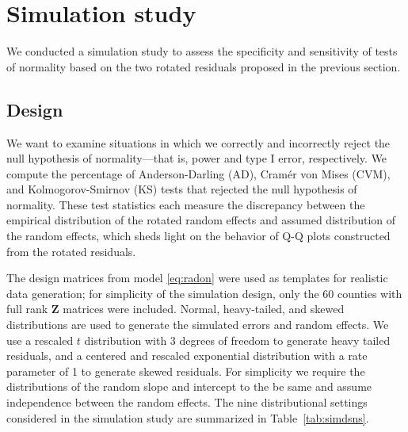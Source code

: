 \documentclass[12pt]{article} %
\begin{document}
\section{Simulation study}\label{sec:simulation}

We conducted a simulation study to assess the specificity and sensitivity of tests of normality based on the two rotated residuals proposed in the previous section. 

\subsection{Design}\label{sec:sim-design}

We want to examine situations in which we correctly and incorrectly reject the null hypothesis of normality---that is, power and type I error, respectively. We compute the percentage of Anderson-Darling (AD), Cram{\'e}r von Mises (CVM), and Kolmogorov-Smirnov (KS) tests that rejected the null hypothesis of normality.
 These test statistics each measure the discrepancy between the empirical distribution of the rotated random effects and assumed distribution of the random effects, which sheds light on the behavior of Q-Q plots constructed from the rotated residuals. 


The design matrices from model \eqref{eq:radon} were used as templates for realistic data generation;  for simplicity of the simulation design, only the 60 counties with full rank $\bm{Z}$ matrices were included. 
Normal, heavy-tailed, and skewed distributions are used to generate the simulated errors and random effects. We use a rescaled $t$ distribution with 3 degrees of freedom to generate heavy tailed residuals, and a centered and rescaled exponential distribution with a rate parameter of 1 to generate skewed residuals. For simplicity we require the distributions of the random slope and intercept to the be same and assume independence between the random effects. The nine distributional settings considered in the simulation study are summarized in Table~\ref{tab:simdsns}.
\end{document}
